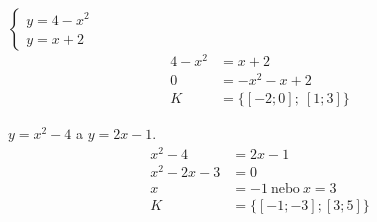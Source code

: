 \documentclass[11pt,a4paper]{article}
\begin{document}
\begin{zadaniReseniBox}[title={Samostatná práce 2}]
$\begin{cases}y=4 - x^{2}\\y=x + 2\end{cases}$
\tcblower
\[
\begin{aligned}
4 - x^{2}&=x + 2\\[2pt]
0&=- x^{2} - x + 2\\[2pt]
K&=\{[-2;0];\ [1;3]\}
\end{aligned}
\]
\end{zadaniReseniBox}
\begin{zadaniReseniBox}[title={Rozšíření 1}]
$y=x^2-4$ a $y=2x-1$.
\tcblower
\[\begin{aligned}
x^2-4&=2x-1\\x^2-2x-3&=0\\x&=-1\ \text{nebo}\ x=3\\K&=\{[-1;-3];[3;5]\}
\end{aligned}\]
\end{zadaniReseniBox}
\end{document}
